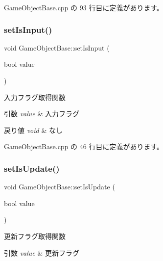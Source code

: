  Game\+Object\+Base.\+cpp の 93 行目に定義があります。

\mbox{\label{class_game_object_base_affe3edcdf6374f2138c306007fa66fca}} 
\subsubsection{\texorpdfstring{set\+Is\+Input()}{setIsInput()}}
{\footnotesize\ttfamily void Game\+Object\+Base\+::set\+Is\+Input (\begin{DoxyParamCaption}\item[{bool}]{value }\end{DoxyParamCaption})}



入力フラグ取得関数 


\begin{DoxyParams}{引数}
{\em value} & 入力フラグ \\
\hline
\end{DoxyParams}

\begin{DoxyRetVals}{戻り値}
{\em void} & なし \\
\hline
\end{DoxyRetVals}


 Game\+Object\+Base.\+cpp の 46 行目に定義があります。

\mbox{\label{class_game_object_base_aba5110b5f5a877c95ebc675cef428679}} 
\subsubsection{\texorpdfstring{set\+Is\+Update()}{setIsUpdate()}}
{\footnotesize\ttfamily void Game\+Object\+Base\+::set\+Is\+Update (\begin{DoxyParamCaption}\item[{bool}]{value }\end{DoxyParamCaption})}



更新フラグ取得関数 


\begin{DoxyParams}{引数}
{\em value} & 更新フラグ \\
\hline
\end{DoxyParams}

